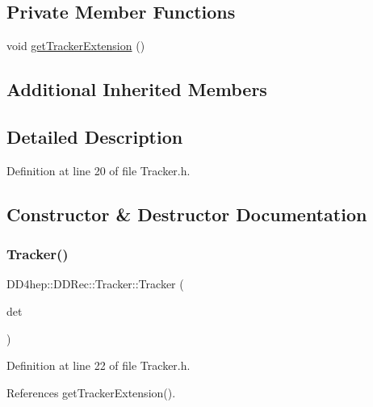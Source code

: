 \subsection*{Private Member Functions}
\begin{DoxyCompactItemize}
\item 
void \hyperlink{class_d_d4hep_1_1_d_d_rec_1_1_tracker_aff21170847730cec8db36f09873ef52c}{get\+Tracker\+Extension} ()
\end{DoxyCompactItemize}
\subsection*{Additional Inherited Members}


\subsection{Detailed Description}


Definition at line 20 of file Tracker.\+h.



\subsection{Constructor \& Destructor Documentation}
\hypertarget{class_d_d4hep_1_1_d_d_rec_1_1_tracker_acd3f6faae57cfcd0cf7925e1473358ba}{}\label{class_d_d4hep_1_1_d_d_rec_1_1_tracker_acd3f6faae57cfcd0cf7925e1473358ba} 
\subsubsection{\texorpdfstring{Tracker()}{Tracker()}}
{\footnotesize\ttfamily D\+D4hep\+::\+D\+D\+Rec\+::\+Tracker\+::\+Tracker (\begin{DoxyParamCaption}\item[{const \hyperlink{class_d_d4hep_1_1_geometry_1_1_det_element}{Geometry\+::\+Det\+Element} \&}]{det }\end{DoxyParamCaption})\hspace{0.3cm}{\ttfamily [inline]}}



Definition at line 22 of file Tracker.\+h.



References get\+Tracker\+Extension().

